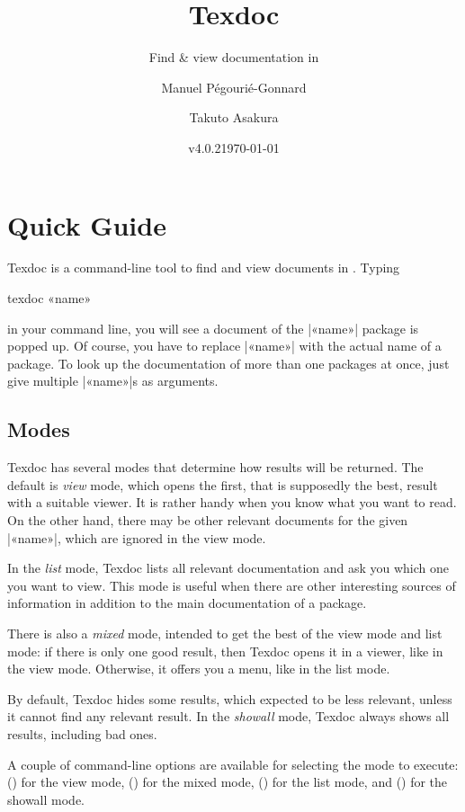 \documentclass{texdoc-doc}
\title{Texdoc}
\subtitle{Find \& view documentation in \TL}
\author{Manuel Pégourié-Gonnard\and Takuto Asakura}
\date{v4.0.2\quad \today}
\begin{document}
\VerbatimFootnotes

\maketitle

\section{Quick Guide}

Texdoc is a command-line tool to find and view documents in {\TL}. Typing
%
\begin{htcode}
texdoc «name»
\end{htcode}
%
in your command line, you will see a document of the |«name»| package is popped
up. Of course, you have to replace |«name»| with the actual name of a package.
To look up the documentation of more than one packages at once, just give
multiple |«name»|s as arguments.

\subsection{Modes}
\label{sec:modes}

Texdoc has several modes that determine how results will be returned. The
default is \emph{view} mode, which opens the first, that is supposedly the
best, result with a suitable viewer. It is rather handy when you know what you
want to read. On the other hand, there may be other relevant documents for the
given |«name»|, which are ignored in the view mode.

In the \emph{list} mode, Texdoc lists all relevant documentation and ask you
which one you want to view. This mode is useful when there are other
interesting sources of information in addition to the main documentation of a
package.

There is also a \emph{mixed} mode, intended to get the best of the view mode
and list mode: if there is only one good result, then Texdoc opens it in a
viewer, like in the view mode. Otherwise, it offers you a menu, like in the
list mode.

By default, Texdoc hides some results, which expected to be less relevant,
unless it cannot find any relevant result. In the \emph{showall} mode, Texdoc
always shows all results, including bad ones.

A couple of command-line options are available for selecting the mode to
execute:  () for the view mode,  () for
the mixed mode,  () for the list mode, and 
() for the showall mode.
\end{document}
